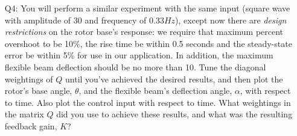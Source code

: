 \documentclass[12pt]{report}
\newcommand\drew[1]{\textcolor{red}{#1}}
\begin{document}
\begin{enumerate}
    \item[Q4:] You will perform a similar experiment with the same input (square wave with amplitude of 30 and frequency of 0.33$Hz$), except now there are \emph{design restrictions} on the rotor base's response: we require that maximum percent overshoot to be 10\%, the rise time be within 0.5 seconds and the steady-state error be within 5\% for use in our application. In addition, the maximum flexible beam deflection should be no more than 10\degree. Tune the diagonal weightings of $Q$ until you've achieved the desired results, and then plot the rotor's base angle, $\theta$, and the flexible beam's deflection angle, $\alpha$, with respect to time. Also plot the control input with respect to time. What weightings in the matrix $Q$ did you use to achieve these results, and what was the resulting feedback gain, $K$?\\
\end{enumerate}
\end{document}

